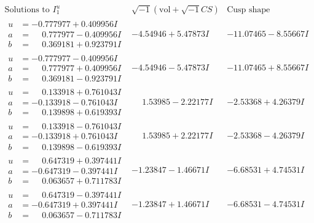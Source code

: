 \documentclass[1p]{elsarticle_modified}
\theoremstyle{definition}
\newcommand{\I}{\sqrt{-1}}
\begin{document}
$$\begin{array}{c|c|c}  
\text{Solutions to }I^u_{1}& \I (\text{vol} + \sqrt{-1}CS) & \text{Cusp shape}\\
 \hline 
\begin{aligned}
u &= -0.777977 + 0.409956 I \\
a &= \phantom{-}0.777977 - 0.409956 I \\
b &= \phantom{-}0.369181 + 0.923791 I\end{aligned}
 & -4.54946 + 5.47873 I & -11.07465 - 8.55667 I \\ \hline\begin{aligned}
u &= -0.777977 - 0.409956 I \\
a &= \phantom{-}0.777977 + 0.409956 I \\
b &= \phantom{-}0.369181 - 0.923791 I\end{aligned}
 & -4.54946 - 5.47873 I & -11.07465 + 8.55667 I \\ \hline\begin{aligned}
u &= \phantom{-}0.133918 + 0.761043 I \\
a &= -0.133918 - 0.761043 I \\
b &= \phantom{-}0.139898 + 0.619393 I\end{aligned}
 & \phantom{-}1.53985 - 2.22177 I & -2.53368 + 4.26379 I \\ \hline\begin{aligned}
u &= \phantom{-}0.133918 - 0.761043 I \\
a &= -0.133918 + 0.761043 I \\
b &= \phantom{-}0.139898 - 0.619393 I\end{aligned}
 & \phantom{-}1.53985 + 2.22177 I & -2.53368 - 4.26379 I \\ \hline\begin{aligned}
u &= \phantom{-}0.647319 + 0.397441 I \\
a &= -0.647319 - 0.397441 I \\
b &= \phantom{-}0.063657 + 0.711783 I\end{aligned}
 & -1.23847 - 1.46671 I & -6.68531 + 4.74531 I \\ \hline\begin{aligned}
u &= \phantom{-}0.647319 - 0.397441 I \\
a &= -0.647319 + 0.397441 I \\
b &= \phantom{-}0.063657 - 0.711783 I\end{aligned}
 & -1.23847 + 1.46671 I & -6.68531 - 4.74531 I \\ \hline\begin{aligned}

\end{aligned}
\end{array}$$
\end{document}
